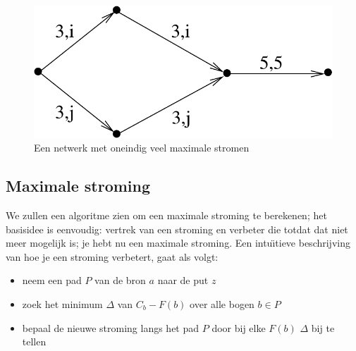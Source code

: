 \begin{figure}[ht]
\begin{center}
\includegraphics[width=0.3\linewidth,keepaspectratio]{stroom3} %
\end{center}
\caption{Een netwerk met oneindig veel maximale stromen\label{stroom3}}
\end{figure}


\subsection{Maximale stroming}

We zullen een algoritme zien om een maximale stroming te berekenen; 
het basisidee is eenvoudig: vertrek van een stroming en verbeter die totdat
dat niet meer mogelijk is; je hebt nu een maximale stroming. Een
intu\"{\i}tieve beschrijving van hoe je een stroming verbetert, gaat als
volgt:
\begin{itemize}
\item
neem een pad $P$ van de bron $a$ naar de put $z$
\item
zoek het minimum $\Delta$ van $C_{b} - F(b)$ over alle bogen $b \in P$
\item
bepaal de nieuwe stroming langs het pad $P$ door bij elke $F(b)$ $\Delta$ 
bij te tellen
\end{itemize}

